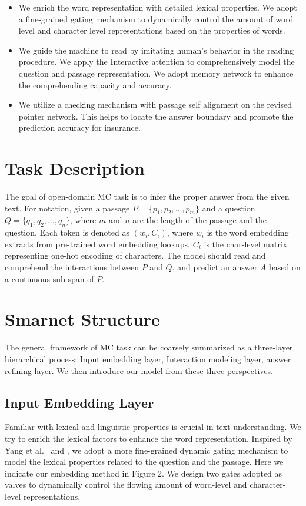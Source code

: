 \documentclass[letterpaper]{article} \usepackage{aaai18}  \usepackage{times}  \usepackage{helvet}  \usepackage{courier}  \usepackage{url}  \usepackage{graphicx}  \usepackage{booktabs}
\begin{document}
\begin{itemize}
	\item We enrich the word representation with detailed lexical properties. We adopt a fine-grained gating mechanism to dynamically control the amount of word level and character level representations based on the properties of words.
	\item We guide the machine to read by imitating human's behavior in the reading procedure. We apply the Interactive attention to comprehensively model the question and passage representation. We adopt memory network to enhance the comprehending capacity and accuracy. 
	\item We utilize a checking mechanism with passage self alignment on the revised pointer network. This helps to locate the answer boundary and promote the prediction accuracy for insurance. 
\end{itemize}
 
 \section{Task Description}
The goal of open-domain MC task is to infer the proper answer from the given text. For notation, given a passage $P=\{p_1,p_2,...,p_m\}$ and a question $Q=\{q_1,q_2,...,q_n\}$, where $m$ and $n $ are the length of the passage and the question. Each token is denoted as $(w_i,C_i)$, where $w_i$ is the word embedding extracts from pre-trained word embedding lookups, $C_i$ is the char-level matrix representing one-hot encoding of characters. The model should read and comprehend the interactions between $P$ and $Q$, and predict an answer $A$ based on a continuous sub-span of $P$. 
 
 \section{ Smarnet Structure}
 The general framework of MC task can be coarsely summarized as a three-layer hierarchical process: Input embedding layer, Interaction modeling layer, answer refining layer. We then introduce our model from these three perspectives. 

 \subsection{Input Embedding Layer}
  Familiar with lexical and linguistic properties is crucial in text understanding. We try to enrich the lexical factors to enhance the word representation. Inspired by Yang et al.~\cite{Yang2016Words} \cite{Monsalve2012Lexical} \cite{Liu2017Structural} and \cite{chen2017reading}, we adopt a more fine-grained dynamic gating mechanism to model the lexical properties related to the question and the passage. Here we indicate our embedding method in Figure 2. We design two gates adopted as valves to dynamically control the flowing amount of word-level and character-level representations. 
  
\end{document}

